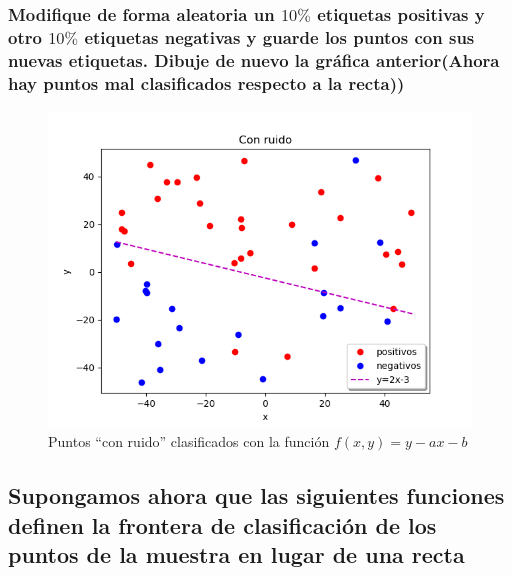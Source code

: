 \documentclass[12pt,a4paper]{article}
\begin{document}
\subsubsection{Modifique de forma aleatoria un $10\%$ etiquetas positivas y otro $10\%$ etiquetas negativas y guarde los puntos con sus nuevas etiquetas. Dibuje de nuevo la gráfica anterior(Ahora hay puntos mal clasificados respecto a la recta))}
\begin{figure}[H]  %
	\centering
	\includegraphics{images/ejercicio2ConRuido.png}  
	\caption{Puntos ``con ruido'' clasificados con la función $f(x,y)=y-ax-b$}
	\label{figura4}
\end{figure}

\subsection{Supongamos ahora que las siguientes funciones definen la frontera de clasificación de los puntos de la muestra en lugar de una recta}
\end{document}
